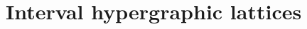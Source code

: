 \documentclass[reqno]{amsart}
\newtheorem{proposition}[theorem]{Proposition}
\theoremstyle{definition}
\newcommand{\I}{\mathbb{I}} %
\newcommand{\cal}[1]{\mathcal{#1}} %
\newcommand{\ssm}{\smallsetminus} %
\newcommand{\vincent}[1]{\todo[size=\tiny,color=blue!30]{ #1 \\ \hfill --- V.}\,}
\newcommand{\II}{\mathbb I} %
\newcommand{\cX}{\cal{X}}
\newcommand{\cY}{\cal{Y}}
\begin{document}
%
%


\section{Interval hypergraphic lattices}
\label{sec:LatticePI}
\end{document}

